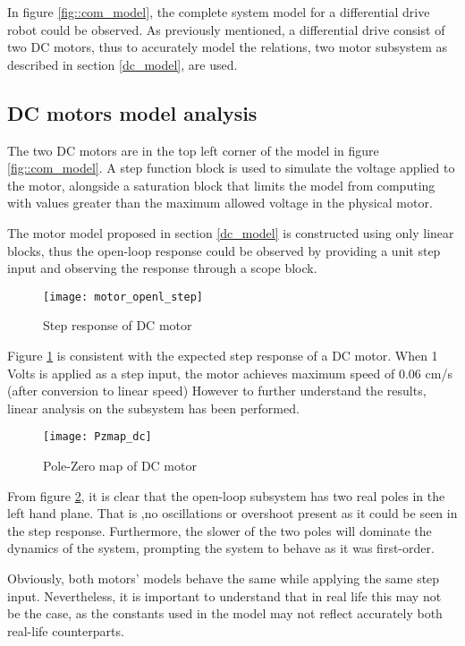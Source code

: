 In figure \ref{fig::com_model}, the complete system model for a differential drive robot could be observed. As previously mentioned, a differential drive consist of two DC motors, thus to accurately model the relations, two motor subsystem as described in section \ref{dc_model}, are used. 

\subsection{DC motors model analysis} 

The two DC motors are in the top left corner of the model in figure \ref{fig::com_model}. A step function block is used to simulate the voltage applied to the motor, alongside a saturation block that limits the model from  computing with values greater than the maximum allowed voltage in the physical motor. 

The motor model proposed in section \ref{dc_model} is constructed using only linear blocks, thus the open-loop response could be observed by providing a unit step input and observing the response through a scope block. 

\begin{figure}[h]
\centering
\texttt{[image: motor\_openl\_step]}
\caption{Step response of DC motor}
\label{fig::dc_step}
\end{figure} 

Figure \ref{fig::dc_step} is consistent with the expected step response of a DC motor. When 1 Volts is applied as a step input, the motor achieves maximum speed of 0.06 cm/s (after conversion to linear speed) However to further understand the results, linear analysis on the subsystem has been performed.

\begin{figure}[h]
\centering
\texttt{[image: Pzmap\_dc]}
\caption{Pole-Zero map of DC motor}
\label{fig::dc_pz}
\end{figure} 

From figure \ref{fig::dc_pz}, it is clear that the open-loop subsystem has two real poles in the left hand plane. That is ,no oscillations or overshoot present as it could be seen in the step response. Furthermore, the slower of the two poles will dominate the dynamics of the system, prompting the system to behave as it was first-order. 

Obviously, both motors' models behave the same while applying the same step input. Nevertheless, it is important to understand that in real life this may not be the case, as the constants used in the model may not reflect accurately both real-life counterparts.

